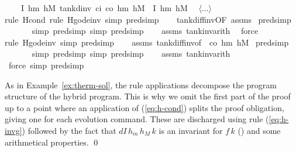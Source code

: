 \documentclass[envcountsame,envcountsect]{llncs}
\begin{document}
\begin{example}
\begin{isabellebody}
\ \ \ {\isachardoublequoteopen}\ \isactrlbold {\isacharbraceleft}I\ h\isactrlsub m\ h\isactrlsub M\isactrlbold {\isacharbraceright}\ tank{\isacharunderscore}dinv\ c\isactrlsub i\ c\isactrlsub o\ h\isactrlsub m\ h\isactrlsub M\ {\isasymtau}\ \isactrlbold {\isacharbraceleft}I\ h\isactrlsub m\ h\isactrlsub M\isactrlbold {\isacharbraceright}{\isachardoublequoteclose}\isanewline
\ \ $\langle \dots\rangle$\ \isamarkupfalse%
{\isacharparenleft}rule\ H{\isacharunderscore}cond{\isacharcomma}\ rule\ H{\isacharunderscore}g{\isacharunderscore}ode{\isacharunderscore}inv{\isacharcomma}\ simp{\isacharcomma}\ pred{\isacharunderscore}simp{\isacharparenright}\isanewline
\ \ \isamarkupfalse%
\ tank{\isacharunderscore}diff{\isacharunderscore}inv{\isacharbrackleft}OF\ assms{\isacharparenleft}{}{\isacharparenright}{\isacharbrackright}\ \isamarkupfalse%
{\isacharparenleft}pred{\isacharunderscore}simp{\isacharparenright}\isanewline
\ \ \ \ \ \ \isamarkupfalse%
{\isacharparenleft}simp{\isacharcomma}\ pred{\isacharunderscore}simp{\isacharcomma}\ simp{\isacharcomma}\ pred{\isacharunderscore}simp{\isacharparenright}\isanewline
\ \ \isamarkupfalse%
\ assms\ tank{\isacharunderscore}inv{\isacharunderscore}arith{}\ \isamarkupfalse%
\ force\isanewline
\ \ \ \ \isamarkupfalse%
{\isacharparenleft}rule\ H{\isacharunderscore}g{\isacharunderscore}ode{\isacharunderscore}inv{\isacharcomma}\ simp{\isacharcomma}\ pred{\isacharunderscore}simp{\isacharparenright}\isanewline
\ \ \isamarkupfalse%
\ assms\ tank{\isacharunderscore}diff{\isacharunderscore}inv{\isacharbrackleft}of\ {\isacharunderscore}\ {\isachardoublequoteopen}{\isacharminus}c\isactrlsub o{\isachardoublequoteclose}\ h\isactrlsub m\ h\isactrlsub M{\isacharbrackright}\ \isamarkupfalse%
{\isacharparenleft}pred{\isacharunderscore}simp{\isacharparenright}\isanewline
\ \ \ \ \ \ \isamarkupfalse%
{\isacharparenleft}simp{\isacharcomma}\ pred{\isacharunderscore}simp{\isacharcomma}\ simp{\isacharcomma}\ pred{\isacharunderscore}simp{\isacharparenright}\isanewline
\ \ \isamarkupfalse%
\ assms\ tank{\isacharunderscore}inv{\isacharunderscore}arith{}\ \isamarkupfalse%
\ force\ {\isacharparenleft}simp{\isacharcomma}\ pred{\isacharunderscore}simp{\isacharparenright}\isanewline
\end{isabellebody}

As in Example~\ref{ex:therm-sol}, the rule applications decompose the program structure of the hybrid program. This is why we omit the first part of the proof up to a point where an application of (\ref{eq:h-cond}) splits the proof obligation, giving one for each evolution command. These are discharged using rule (\ref{eq:h-invg}) followed by the fact that $dI\, h_m\, h_M\, k$ is an invariant for $f\, k$ () and some arithmetical properties. \qed
\end{example}
\end{document}
